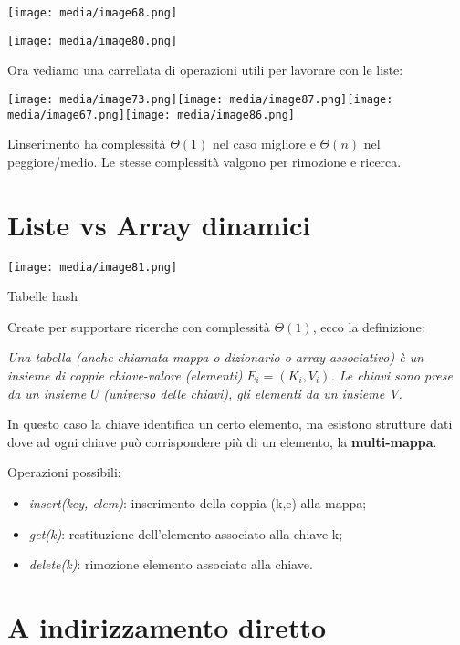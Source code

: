 \texttt{[image: media/image68.png]}

\texttt{[image: media/image80.png]}

Ora vediamo una carrellata di operazioni utili per lavorare con le
liste:

\texttt{[image: media/image73.png]}\texttt{[image: media/image87.png]}\texttt{[image: media/image67.png]}\texttt{[image: media/image86.png]}

L\textquotesingle inserimento ha complessità \(\Theta(1)\) nel caso
migliore e \(\Theta(n)\) nel peggiore/medio. Le stesse complessità
valgono per rimozione e ricerca.

\section{Liste vs Array dinamici}\label{liste-vs-array-dinamici}

\texttt{[image: media/image81.png]}

Tabelle hash

Create per supportare ricerche con complessità \(\Theta(1)\), ecco la
definizione:

\emph{Una tabella (anche chiamata mappa o dizionario o array
associativo) è un insieme di coppie chiave-valore (elementi)}
\(E_{i} = (K_{i},V_{i})\)\emph{. Le chiavi sono prese da un insieme}
\(U\) \emph{(universo delle chiavi), gli elementi da un insieme V.}

In questo caso la chiave identifica un certo elemento, ma esistono
strutture dati dove ad ogni chiave può corrispondere più di un elemento,
la \textbf{multi-mappa}.

Operazioni possibili:

\begin{itemize}
\item
  \emph{insert(key, elem)}: inserimento della coppia (k,e) alla mappa;
\item
  \emph{get(k)}: restituzione dell'elemento associato alla chiave k;
\item
  \emph{delete(k)}: rimozione elemento associato alla chiave.
\end{itemize}

\section{A indirizzamento diretto}\label{a-indirizzamento-diretto}

